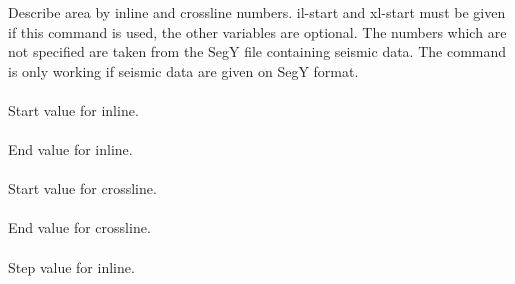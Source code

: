 \subsubsection{}
 \slist
   \item \Description Describe area by inline and crossline numbers. il-start and xl-start must be given if this command is used, the other variables are optional. The numbers which are not specified are taken from the SegY file containing seismic data. The command is only working if seismic data are given on SegY format.
   \item \Argument
   \item \Default
 \elist

\paragraph{}
 \slist
   \item \Description Start value for inline.
   \item \Argument
   \item \Default
 \elist
\paragraph{}
 \slist
   \item \Description End value for inline.
   \item \Argument
   \item \Default
 \elist
\paragraph{}
 \slist
   \item \Description Start value for crossline.
   \item \Argument
   \item \Default
 \elist
\paragraph{}
 \slist
   \item \Description End value for crossline.
   \item \Argument
   \item \Default
 \elist
\paragraph{}
 \slist
   \item \Description Step value for inline.
   \item \Argument
   \item \Default
 \elist

